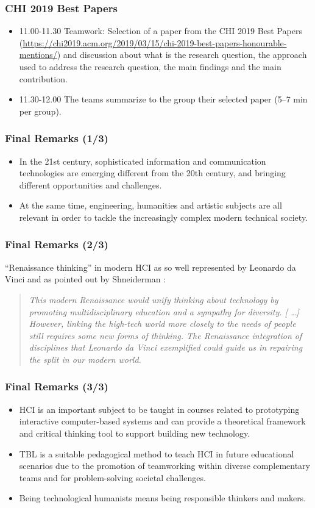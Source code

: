 \documentclass[screen, aspectratio=169]{beamer}
\begin{document}
%
\begin{frame}
\frametitle{CHI 2019 Best Papers}
\begin{itemize}
\item 11.00-11.30 Teamwork: Selection of a paper from the CHI 2019 Best Papers (\url{https://chi2019.acm.org/2019/03/15/chi-2019-best-papers-honourable-mentions/}) and discussion about what is the research question, the approach used to address the research question, the main findings and the main contribution.
\item 11.30-12.00 The teams summarize to the group their selected paper (5--7 min per group).
\end{itemize}
\end{frame}
%
\begin{frame}
\frametitle{Final Remarks (1/3)}
\begin{itemize}
\item In the 21st century, sophisticated information and communication technologies are emerging different from the 20th century, and bringing different opportunities and challenges.
\item At the same time, engineering, humanities and artistic subjects are all relevant in order to tackle the increasingly complex modern technical society. 
\end{itemize}
\end{frame}
%
\begin{frame}
\frametitle{Final Remarks (2/3)}
``Renaissance thinking'' in modern HCI \cite[p.196]{Gross.2014:ICHCI} as so well represented by Leonardo da Vinci and as pointed out by Shneiderman \cite[p.2--3]{Shneiderman.2003:MITPress}:
\begin{quote}
\emph{This modern Renaissance would unify thinking about technology by promoting multidisciplinary education and a sympathy for diversity. [ \ldots ] However, linking the high-tech world more closely to the needs of people still requires some new forms of thinking. The Renaissance integration of disciplines that Leonardo da Vinci exemplified could guide us in repairing the split in our modern world. }
\end{quote}
\end{frame}
%
\begin{frame}
\frametitle{Final Remarks (3/3)}
\begin{itemize}
\item HCI is an important subject to be taught in courses related to prototyping interactive computer-based systems and can provide a theoretical framework and critical thinking tool to support building new technology.
\item TBL is a suitable pedagogical method to teach HCI in future educational scenarios due to the promotion of teamworking within diverse complementary teams and for problem-solving societal challenges.
\item Being technological humanists means being responsible thinkers and makers. 
\end{itemize}
\end{frame}
\end{document}

